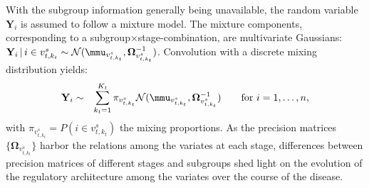 \documentclass[10pt]{article}
\begin{document}
With the subgroup information generally being unavailable, the random variable $\mathbf{Y}_i$ is assumed to follow a mixture model. The mixture components, corresponding to a
subgroup$\times$stage-combination, are multivariate Gaussians: $\mathbf{Y}_{i} \, | \, i \in v_{t, k_t}^s \sim \mathcal{N}(\mmu_{v_{t, k_t}^s}, \mathbf{\Omega}_{v_{t, k_t}^s}^{-1})$. Convolution with a discrete mixing distribution yields:
\begin{eqnarray} \label{form:mixtureModel}
\mathbf{Y}_{i} & \sim & \sum_{k_t=1}^{K_t} \pi_{v_{t, k_t}^s} \mathcal{N}(\mmu_{v_{t, k_t}^s}, \mathbf{\Omega}_{v_{t, k_t}^s}^{-1}) \qquad \mbox{for } i=1, \ldots, n,
\end{eqnarray}
with $\pi_{v_{t, k_t}^s} = P(i \in v_{t, k_t}^s )$ the mixing proportions. As the precision matrices $\{ \mathbf{\Omega}_{v_{t, k_t}^s} \}$ harbor the relations among the variates at each stage, differences between precision matrices of different stages and subgroups shed light on the evolution of the regulatory architecture among the variates over the course of the disease.


\end{document}
